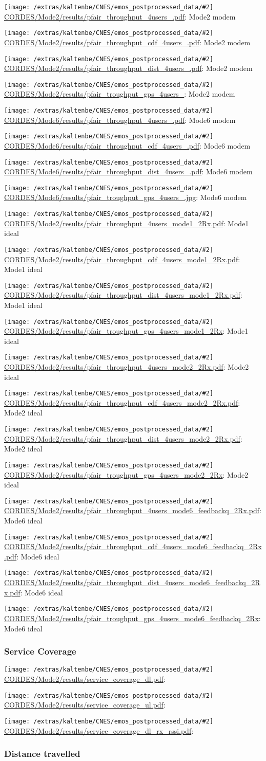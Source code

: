 \documentclass[a4paper,10pt]{article}
\newcommand{\printfile}[2][]{
 \begin{minipage}{8cm}
  \centering
  \texttt{[image: /extras/kaltenbe/CNES/emos\_postprocessed\_data/\#2]}
  \url{#2}: #1

 \end{minipage}
}
\begin{document}
\printfile[Mode2 modem]{CORDES/Mode2/results/pfair_throughput_4users_.pdf}
\printfile[Mode2 modem]{CORDES/Mode2/results/pfair_throughput_cdf_4users_.pdf}

\printfile[Mode2 modem]{CORDES/Mode2/results/pfair_throughput_dist_4users_.pdf}
\printfile[Mode2 modem]{CORDES/Mode2/results/pfair_troughput_gps_4users_}

\printfile[Mode6 modem]{CORDES/Mode6/results/pfair_throughput_4users_.pdf}
\printfile[Mode6 modem]{CORDES/Mode6/results/pfair_throughput_cdf_4users_.pdf}

\printfile[Mode6 modem]{CORDES/Mode6/results/pfair_throughput_dist_4users_.pdf}
\printfile[Mode6 modem]{CORDES/Mode6/results/pfair_troughput_gps_4users_.jpg}

\printfile[Mode1 ideal]{CORDES/Mode2/results/pfair_throughput_4users_mode1_2Rx.pdf}
\printfile[Mode1 ideal]{CORDES/Mode2/results/pfair_throughput_cdf_4users_mode1_2Rx.pdf}

\printfile[Mode1 ideal]{CORDES/Mode2/results/pfair_throughput_dist_4users_mode1_2Rx.pdf}
\printfile[Mode1 ideal]{CORDES/Mode2/results/pfair_troughput_gps_4users_mode1_2Rx}

\printfile[Mode2 ideal]{CORDES/Mode2/results/pfair_throughput_4users_mode2_2Rx.pdf}
\printfile[Mode2 ideal]{CORDES/Mode2/results/pfair_throughput_cdf_4users_mode2_2Rx.pdf}

\printfile[Mode2 ideal]{CORDES/Mode2/results/pfair_throughput_dist_4users_mode2_2Rx.pdf}
\printfile[Mode2 ideal]{CORDES/Mode2/results/pfair_troughput_gps_4users_mode2_2Rx}

\printfile[Mode6 ideal]{CORDES/Mode2/results/pfair_throughput_4users_mode6_feedbackq_2Rx.pdf}
\printfile[Mode6 ideal]{CORDES/Mode2/results/pfair_throughput_cdf_4users_mode6_feedbackq_2Rx.pdf}

\printfile[Mode6 ideal]{CORDES/Mode2/results/pfair_throughput_dist_4users_mode6_feedbackq_2Rx.pdf}
\printfile[Mode6 ideal]{CORDES/Mode2/results/pfair_troughput_gps_4users_mode6_feedbackq_2Rx}


\subsubsection{Service Coverage}

\printfile{CORDES/Mode2/results/service_coverage_dl.pdf}
\printfile{CORDES/Mode2/results/service_coverage_ul.pdf}

\printfile{CORDES/Mode2/results/service_coverage_dl_rx_rssi.pdf}

\subsubsection{Distance travelled}
\label{sec:dist_travelled_cordes}
\end{document}
